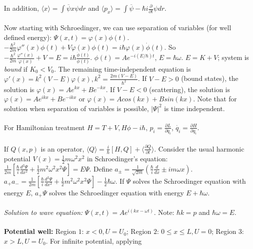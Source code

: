 In addition, 
$\langle x \rangle = \int \overline{\psi} x \psi dr$ and
$\langle p_x \rangle = \int \overline{\psi} - \hbar i {\frac {\partial} {\partial t}} \psi dr$.
\\
\\
Now starting with Schroedinger, we can use separation of variables (for well defined
energy): $\Psi(x,t)= \varphi(x) \phi(t)$. 
$-{\frac {\hbar^2} {2m}} \varphi''(x) \phi(t) + 
V \varphi(x) \phi(t)= i \hbar \varphi(x) {\dot \phi}(t)$. 
So $-{\frac {\hbar^2} {2m}} {\frac {\varphi''(x)} {\varphi(x)}} + V = E=
i \hbar {\frac {{\dot \phi}(t)} {\phi(t)}}$. $\phi(t)= A e^{-i(E/\hbar)t}$,
$E= \hbar \omega$.  $E=K+V$; system is \emph{bound} if $K_0<V_0$.  The
remaining time-independent equation is
$\varphi'(x)= k^2 (V-E) \varphi(x), k^2= {\frac {2m(V-E)} {\hbar^2}}$.  
If $V-E>0$ (bound states), the solution is 
$\varphi(x)= A e^{kx}+ B e^{-kx}$.
If $V-E<0$ (scattering), the solution is 
$\varphi(x)= A e^{ikx}+ B e^{-ikx}$ or
$\varphi(x)= A cos(kx)+ B sin(kx)$.
Note that for solution when separation of variables is possible, $|\Psi|^2$ is time 
independent.  \\
\\
For Hamiltonian treatment
$H= T+V, H \phi - i \hbar$, $p_i = {\frac {\partial L}{\partial {\dot{q_i}}}}$,
$\dot{q_i} = {\frac {\partial H} {\partial {q_i}}}$.
\\
\\
If $Q(x,p)$ is an operator,
$\langle Q \rangle = {\frac {i} {\hbar}} [H, Q] + \langle {\frac {\partial Q} {\partial t}} \rangle$.
Consider the usual harmonic potential $V(x) = {\frac 1 2} m \omega^2 x^2$ in Schroedinger's equation:
${\frac {1} {2m}}[{\frac {\hbar} {i}} {\frac {d^2 \Psi}{dx^2}} + {\frac 1 2} m^2 \omega^2 x^2 \Psi]= E \Psi$.
Define $a_{\pm} = {\frac 1 {\sqrt {2m}}} ({\frac {\hbar} {i}} {\frac d {dx}} \pm i m \omega x)$.
$a_+ a_- = {\frac {1} {2m}}[{\frac {\hbar} {i}} {\frac {d^2 \Psi}{dx^2}} + {\frac 1 2} m^2 \omega^2 x^2 \Psi] - 
{\frac 1 2} \hbar \omega$.  If $\Psi$ solves the Schroedinger equation with energy $E$, $a_+ \Psi$  solves
the Schroedinger equation with energy $E + \hbar \omega$.\\
\\
\emph{Solution to wave equation:} $\Psi(x, t) = A e^{i(kx- \omega t)}$.  Note: $\hbar k = p$ and $\hbar \omega = E$.
\\
\\
{\bf Potential well:}  
Region $1$: $x<0, U=U_0$; 
Region $2$: $0 \le x \le L, U=0$; 
Region $3$: $x > L, U=U_0$.  
For infinite potential, applying
